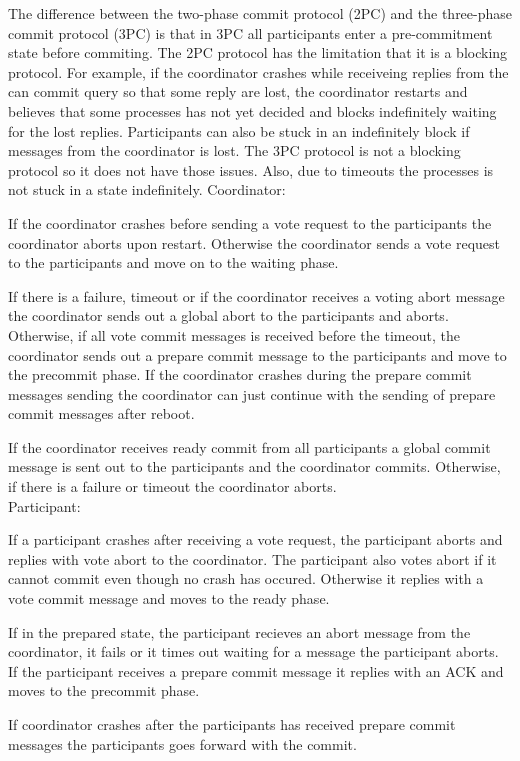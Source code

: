 \documentclass[a4paper]{article}
\newcommand{\question}[2][]{
  \parbox[t]{\textwidth}{
    \ifthenelse{\equal{#1}{}}{}{#1)}
    \parbox[t]{0.95\textwidth}{#2}}\\}
\newcommand{\solution}[2][]{
  \ifthenelse{\equal{#1}{} \or \equal{#1}{a}}{\\[3pt]\textit{Solution: }\\[0.1cm]}{}
  \question[#1]{#2}
}
\begin{document}
%
\solution{
  The difference between the two-phase commit protocol (2PC)
  and the three-phase commit protocol (3PC) is that in 3PC all
  participants enter a pre-commitment state before commiting.
  The 2PC protocol has the limitation that it is a blocking
  protocol. For example, if the coordinator crashes while
  receiveing replies from the can commit query so that some reply
  are lost, the coordinator restarts and believes that some processes
  has not yet decided and blocks indefinitely waiting for the lost
  replies. Participants can also be stuck in an indefinitely block
  if messages from the coordinator is lost.
  The 3PC protocol is not a blocking protocol so it does not have
  those issues. Also, due to timeouts the processes is not stuck in
  a state indefinitely.
  \usebox{\userinput}
  Coordinator:

  If the coordinator crashes before sending a vote request to the
  participants the coordinator aborts upon restart. Otherwise the
  coordinator sends a vote request to the participants and move
  on to the waiting phase.

  If there is a failure, timeout or if the coordinator receives a
  voting abort message the coordinator sends out a global abort to
  the participants and aborts. Otherwise, if all vote commit messages
  is received before the timeout, the coordinator sends out a prepare
  commit message to the participants and move to the precommit phase.
  If the coordinator crashes during the prepare commit messages sending
  the coordinator can just continue with the sending of prepare commit
  messages after reboot.

  If the coordinator receives ready commit from all participants a global
  commit message is sent out to the participants and the coordinator
  commits. Otherwise, if there is a failure or timeout the coordinator
  aborts. \\

  Participant:

  If a participant crashes after receiving a vote request, the
  participant aborts and replies with vote abort to the coordinator.
  The participant also votes abort if it cannot commit even though
  no crash has occured. Otherwise it replies with a vote commit message
  and moves to the ready phase.

  If in the prepared state, the participant recieves an abort message
  from the coordinator, it fails or it times out waiting for a message
  the participant aborts. If the participant receives a prepare commit
  message it replies with an ACK and moves to the precommit phase.

  If coordinator crashes after the participants has received prepare
  commit messages the participants goes forward with the commit.
}
\end{document}
